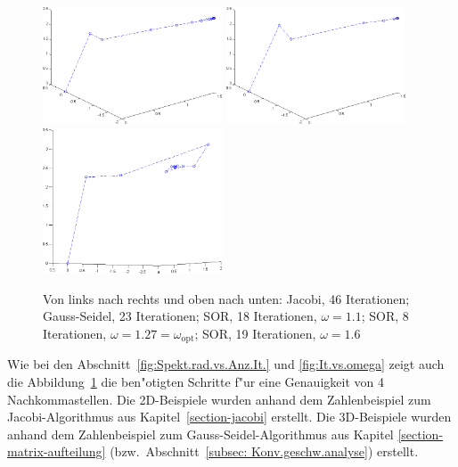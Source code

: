 \begin{refsection}
\begin{figure}
\includegraphics[width=0.475\textwidth]{sor/img/SOR_3D_18_It_w_1_1.png}\hfill
\includegraphics[width=0.475\textwidth]{sor/img/SOR_3D_8_It_w_1_27.png}\\[1mm]
\includegraphics[width=0.475\textwidth]{sor/img/SOR_3D_19_It_w_1_6.png}
\caption{Von links nach rechts und oben nach unten: Jacobi, 46 Iterationen;
Gauss-Seidel, 23 Iterationen; SOR, 18 Iterationen, $\omega=1.1$;
SOR, 8 Iterationen, $\omega=1.27=\omega_{\text{opt}}$;
SOR, 19 Iterationen, $\omega=1.6$}
\label{fig:3D Bsp}
\end{figure}


Wie bei den Abschnitt~\ref{fig:Spekt.rad.vs.Anz.It.} und
\ref{fig:It.vs.omega} zeigt auch die Abbildung~\ref{fig:3D Bsp}
die ben"otigten Schritte f"ur eine Genauigkeit von 4 Nachkommastellen.
Die 2D-Beispiele wurden anhand dem Zahlenbeispiel zum
Jacobi-Algorithmus aus Kapitel~\ref{section-jacobi} erstellt.
Die 3D-Beispiele wurden anhand dem Zahlenbeispiel zum
Gauss-Seidel-Algorithmus aus Kapitel \ref{section-matrix-aufteilung}
(bzw.~Abschnitt~\ref{subsec: Konv.geschw.analyse}) erstellt.




\end{refsection}
